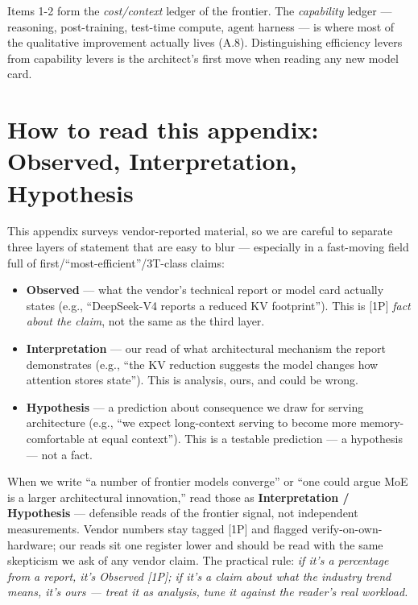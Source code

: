 Items 1-2 form the \emph{cost/context} ledger of the frontier. The
\emph{capability} ledger --- reasoning, post-training, test-time
compute, agent harness --- is where most of the qualitative improvement
actually lives (A.8). Distinguishing efficiency levers from capability
levers is the architect's first move when reading any new model card.

\section{How to read this appendix: Observed, Interpretation,
Hypothesis}\label{how-to-read-this-appendix-observed-interpretation-hypothesis}

This appendix surveys vendor-reported material, so we are careful to
separate three layers of statement that are easy to blur --- especially
in a fast-moving field full of first/``most-efficient''/3T-class claims:

\begin{itemize}
\tightlist
\item
  \textbf{Observed} --- what the vendor's technical report or model card
  actually states (e.g., ``DeepSeek-V4 reports a reduced KV
  footprint''). This is \mbox{{[}1P{]}} \emph{fact about the claim}, not the
  same as the third layer.
\item
  \textbf{Interpretation} --- our read of what architectural mechanism
  the report demonstrates (e.g., ``the KV reduction suggests the model
  changes how attention stores state''). This is analysis, ours, and
  could be wrong.
\item
  \textbf{Hypothesis} --- a prediction about consequence we draw for
  serving architecture (e.g., ``we expect long-context serving to become
  more memory-comfortable at equal context''). This is a testable
  prediction --- a hypothesis --- not a fact.
\end{itemize}

When we write ``a number of frontier models converge'' or ``one could
argue MoE is a larger architectural innovation,'' read those as
\textbf{Interpretation / Hypothesis} --- defensible reads of the
frontier signal, not independent measurements. Vendor numbers stay
tagged \mbox{{[}1P{]}} and flagged verify-on-own-hardware; our reads sit one
register lower and should be read with the same skepticism we ask of any
vendor claim. The practical rule: \emph{if it's a percentage from a
report, it's Observed \mbox{{[}1P{]}}; if it's a claim about what the industry
trend means, it's ours --- treat it as analysis, tune it against the
reader's real workload.}


